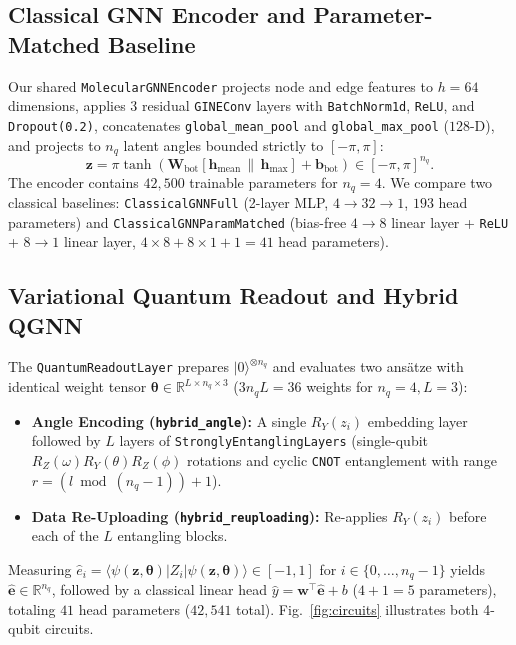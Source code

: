 \documentclass[conference]{IEEEtran}
\begin{document}
\subsection{Classical GNN Encoder and Parameter-Matched Baseline}
Our shared \texttt{MolecularGNNEncoder} projects node and edge features to $h=64$ dimensions, applies 3 residual \texttt{GINEConv} layers with \texttt{BatchNorm1d}, \texttt{ReLU}, and \texttt{Dropout(0.2)}, concatenates \texttt{global\_mean\_pool} and \texttt{global\_max\_pool} ($128$-D), and projects to $n_q$ latent angles bounded strictly to $[-\pi, \pi]$:
\begin{equation}
\mathbf{z} = \pi \tanh\!\left(\mathbf{W}_{\text{bot}} \left[\mathbf{h}_{\text{mean}} \,\|\, \mathbf{h}_{\text{max}}\right] + \mathbf{b}_{\text{bot}}\right) \in [-\pi, \pi]^{n_q}.
\end{equation}
The encoder contains $42{,}500$ trainable parameters for $n_q=4$. We compare two classical baselines: \texttt{ClassicalGNNFull} (2-layer MLP, $4 \rightarrow 32 \rightarrow 1$, $193$ head parameters) and \texttt{ClassicalGNNParamMatched} (bias-free $4 \rightarrow 8$ linear layer + \texttt{ReLU} + $8 \rightarrow 1$ linear layer, $4\times 8 + 8\times 1 + 1 = 41$ head parameters).

\subsection{Variational Quantum Readout and Hybrid QGNN}
The \texttt{QuantumReadoutLayer} prepares $|0\rangle^{\otimes n_q}$ and evaluates two ans\"{a}tze with identical weight tensor $\boldsymbol{\theta} \in \mathbb{R}^{L \times n_q \times 3}$ ($3 n_q L = 36$ weights for $n_q=4, L=3$):
\begin{itemize}
    \item \textbf{Angle Encoding (\texttt{hybrid\_angle}):} A single $R_Y(z_i)$ embedding layer followed by $L$ layers of \texttt{StronglyEntanglingLayers} (single-qubit $R_Z(\omega)R_Y(\theta)R_Z(\phi)$ rotations and cyclic \texttt{CNOT} entanglement with range $r = (l \bmod (n_q-1)) + 1$).
    \item \textbf{Data Re-Uploading (\texttt{hybrid\_reuploading}):} Re-applies $R_Y(z_i)$ before each of the $L$ entangling blocks.
\end{itemize}
Measuring $\hat{e}_i = \langle \psi(\mathbf{z}, \boldsymbol{\theta}) | Z_i | \psi(\mathbf{z}, \boldsymbol{\theta}) \rangle \in [-1, 1]$ for $i \in \{0,\dots,n_q-1\}$ yields $\hat{\mathbf{e}} \in \mathbb{R}^{n_q}$, followed by a classical linear head $\hat{y} = \mathbf{w}^\top \hat{\mathbf{e}} + b$ ($4+1=5$ parameters), totaling $41$ head parameters ($42{,}541$ total). Fig.~\ref{fig:circuits} illustrates both 4-qubit circuits.
\end{document}
